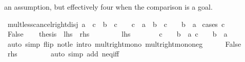 \begin{isabellebody}
\begin{isamarkuptext}
  an assumption, but effectively four when the comparison is a goal.%
\end{isamarkuptext}\isamarkuptrue%
\isamarkupfalse%
\ mult{\isacharunderscore}{\kern0pt}less{\isacharunderscore}{\kern0pt}cancel{\isacharunderscore}{\kern0pt}right{\isacharunderscore}{\kern0pt}disj{\isacharcolon}{\kern0pt}\ {\isachardoublequoteopen}a\ {\isacharasterisk}{\kern0pt}\ c\ {\isacharless}{\kern0pt}\ b\ {\isacharasterisk}{\kern0pt}\ c\ {\isasymlongleftrightarrow}\ {}\ {\isacharless}{\kern0pt}\ c\ {\isasymand}\ a\ {\isacharless}{\kern0pt}\ b\ {\isasymor}\ c\ {\isacharless}{\kern0pt}\ {}\ {\isasymand}\ b\ {\isacharless}{\kern0pt}\ a{\isachardoublequoteclose}\isanewline
%
\isadelimproof
%
\endisadelimproof
%
\isatagproof
{}\isamarkupfalse%
\ {\isacharparenleft}{\kern0pt}cases\ {\isachardoublequoteopen}c\ {\isacharequal}{\kern0pt}\ {}{\isachardoublequoteclose}{\isacharparenright}{\kern0pt}\isanewline
\ \ \isamarkupfalse%
\ False\isanewline
\ \ \isamarkupfalse%
\ {\isacharquery}{\kern0pt}thesis\ {\isacharparenleft}{\kern0pt}\ {\isachardoublequoteopen}{\isacharquery}{\kern0pt}lhs\ {\isasymlongleftrightarrow}\ {\isacharquery}{\kern0pt}rhs{\isachardoublequoteclose}{\isacharparenright}{\kern0pt}\isanewline
\ \ \isamarkupfalse%
\isanewline
\ \ \ \ \isamarkupfalse%
\ {\isacharquery}{\kern0pt}lhs\isanewline
\ \ \ \ \isamarkupfalse%
\ \isamarkupfalse%
\ {\isachardoublequoteopen}c\ {\isacharless}{\kern0pt}\ {}\ {\isasymLongrightarrow}\ b\ {\isacharless}{\kern0pt}\ a{\isachardoublequoteclose}\ {\isachardoublequoteopen}c\ {\isachargreater}{\kern0pt}\ {}\ {\isasymLongrightarrow}\ b\ {\isachargreater}{\kern0pt}\ a{\isachardoublequoteclose}\isanewline
\ \ \ \ \ \ \isamarkupfalse%
\ {\isacharparenleft}{\kern0pt}auto\ simp\ flip{\isacharcolon}{\kern0pt}\ not{\isacharunderscore}{\kern0pt}le\ intro{\isacharcolon}{\kern0pt}\ mult{\isacharunderscore}{\kern0pt}right{\isacharunderscore}{\kern0pt}mono\ mult{\isacharunderscore}{\kern0pt}right{\isacharunderscore}{\kern0pt}mono{\isacharunderscore}{\kern0pt}neg{\isacharparenright}{\kern0pt}\isanewline
\ \ \ \ \isamarkupfalse%
\ False\ \isamarkupfalse%
\ {\isacharquery}{\kern0pt}rhs\ \isanewline
\ \ \ \ \ \ \isamarkupfalse%
\ {\isacharparenleft}{\kern0pt}auto\ simp\ add{\isacharcolon}{\kern0pt}\ neq{\isacharunderscore}{\kern0pt}iff{\isacharparenright}{\kern0pt}\isanewline

\end{isabellebody}
